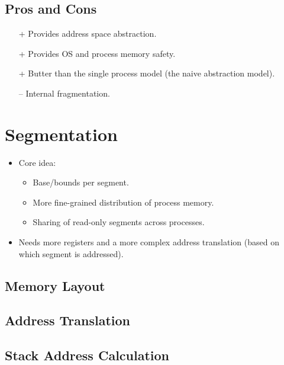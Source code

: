 		\subsection{Pros and Cons}
			\begin{itemize}
				\item[+] Provides address space abstraction.
				\item[+] Provides OS and process memory safety.
				\item[+] Butter than the single process model (the naive abstraction model).
				\item[--] Internal fragmentation.
			\end{itemize}

	\section{Segmentation} %

		\begin{itemize}
			\item Core idea:
				\begin{itemize}
					\item Base/bounds per segment.
					\item More fine-grained distribution of process memory.
					\item Sharing of read-only segments across processes.
				\end{itemize}
			\item Needs more registers and a more complex address translation (based on which segment is addressed).
		\end{itemize}

		\subsection{Memory Layout} %

		\subsection{Address Translation} %

		\subsection{Stack Address Calculation} %

